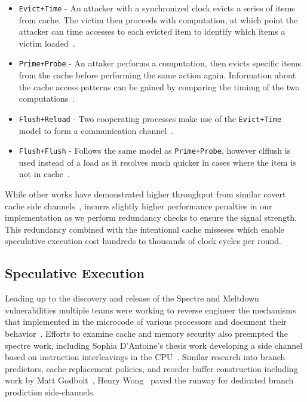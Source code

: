 \begin{itemize}
\item \texttt{Evict+Time} - An attacker with a synchronized clock evicts a series of items 
from cache. The victim then proceeds with computation, at which point the attacker can 
time accesses to each evicted item to identify which items a victim loaded~\cite{neve2006refined}. 
\item \texttt{Prime+Probe} - An attaker performs a computation, then evicts specific 
items from the cache before performing the same action again. Information about the cache
access patterns can be gained by comparing the timimg of the two 
computations~\cite{tromer2010efficient}.
\item \texttt{Flush+Reload} - Two cooperating processes  make use of the \texttt{Evict+Time} 
model to form a communication channel~\cite{yarom2014flush+}.
\item \texttt{Flush+Flush} - Follows the same model as \texttt{Prime+Probe},
however clflush is used instead of a load as it resolves much quicker in cases 
where the item is not in cache~\cite{gruss2016flush+flush}.
\end{itemize}

While other works have demonstrated higher throughput from similar 
covert cache side channels~\cite{liu2015last}, \speculake incurrs slightly higher performance 
penalties in our implementation as we perform redundancy checks to 
ensure the signal strength.  This redundancy combined with the intentional cache misseses
which enable speculative execution cost hundreds to thousands of clock cycles
per round. 


\subsection{Speculative Execution}

Leading up to the discovery and release of the Spectre and Meltdown vulnerabilities
multiple teams were working to reverse engineer the mechanisms that implemented in 
the microcode of various processors and document their behavior~\cite{intel-instruction-tables, uop_article}.
Efforts to examine cache and memory security also preempted the spectre work, 
including Sophia D'Antoine's thesis work developing a side channel based on 
instruction interleavings in the CPU~\cite{d2015exploiting}. Similar research into branch 
predictors, cache replacement policies, and reorder buffer construction including work by Matt 
Godbolt~\cite{godbolt2016branch}, Henry Wong~\cite{measuring-rob} paved the runway for 
dedicated branch prodiction side-channels.

